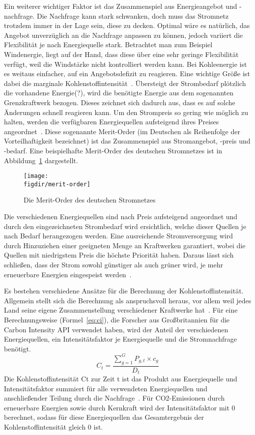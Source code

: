 Ein weiterer wichtiger Faktor ist das Zusammenspiel aus Energieangebot und -nachfrage.
Die Nachfrage kann stark schwanken, doch muss das Stromnetz trotzdem immer in der Lage sein, diese zu decken.
Optimal wäre es natürlich, das Angebot unverzüglich an die Nachfrage anpassen zu können, jedoch variiert die Flexibilität je nach Energiequelle stark.
Betrachtet man zum Beispiel Windenergie, liegt auf der Hand, dass diese über eine sehr geringe Flexibilität verfügt, weil die Windstärke nicht kontrolliert werden kann.
Bei Kohleenergie ist es weitaus einfacher, auf ein Angebotsdefizit zu reagieren.
Eine wichtige Größe ist dabei die marginale Kohlenstoffintensität~\cite{GreenSoftwareFoundation.2022}.
Übersteigt der Strombedarf plötzlich die vorhandene Energie(?), wird die benötigte Energie aus dem sogenannten Grenzkraftwerk bezogen.
Dieses zeichnet sich dadurch aus, dass es auf solche Änderungen schnell reagieren kann.
Um den Strompreis so gering wie möglich zu halten, werden die verfügbaren Energiequellen aufsteigend ihres Preises angeordnet~\cite{Corradi.20231207T10:48:51.000Z}.
Diese sogenannte Merit-Order (im Deutschen als Reihenfolge der Vorteilhaftigkeit bezeichnet) ist das Zusammenspiel aus Stromangebot, -preis und -bedarf.
Eine beispielhafte Merit-Order des deutschen Stromnetzes ist in Abbildung~\ref{FIG:merit-order} dargestellt.
\begin{figure}
 \caption{Die Merit-Order des deutschen Stromnetzes~\cite{Gro.5.10.2022}}
 {\texttt{[image: \\figdir/merit-order]}}
 \label{FIG:merit-order}
\end{figure}
Die verschiedenen Energiequellen sind nach Preis aufsteigend angeordnet und durch den eingezeichneten Strombedarf wird ersichtlich, welche dieser Quellen je nach Bedarf herangezogen werden.
Eine ausreichende Stromversorgung wird durch Hinzuziehen einer geeigneten Menge an Kraftwerken garantiert, wobei die Quellen mit niedrigstem Preis die höchste Priorität haben.
Daraus lässt sich schließen, dass der Strom sowohl günstiger als auch grüner wird, je mehr erneuerbare Energien eingespeist werden~\cite{Gro.5.10.2022}.

Es bestehen verschiedene Ansätze für die Berechnung der Kohlenstoffintensität.
Allgemein stellt sich die Berechnung als anspruchsvoll heraus, vor allem weil jedes Land seine eigene Zusammenstellung verschiedener Kraftwerke hat~\cite{Currie.2024}.
Für eine Berechnungsweise (Formel~\ref{eq:ci}), die Forscher aus Großbritannien für die Carbon Intensity API verwendet haben, wird der Anteil der verschiedenen Energiequellen, ein Intensitätsfaktor je Energiequelle und die Stromnachfrage benötigt.
\begin{equation}
 \label{eq:ci}
 C_t = \frac{\sum_{g=1}^{G} P_{g,t} \times c_g}{D_t}
\end{equation}
Die Kohlenstoffintensität Ct zur Zeit t ist das Produkt aus Energiequelle und Intensitätsfaktor summiert für alle verwendeten Energiequellen und anschließender Teilung durch die Nachfrage~\cite{LyndonRuff.20220420T15:34:17.000Z}.
Für CO2-Emissionen durch erneuerbare Energien sowie durch Kernkraft wird der Intensitätsfaktor mit 0 berechnet, sodass für diese Energiequellen das Gesamtergebnis der Kohlenstoffintensität gleich 0 ist.

